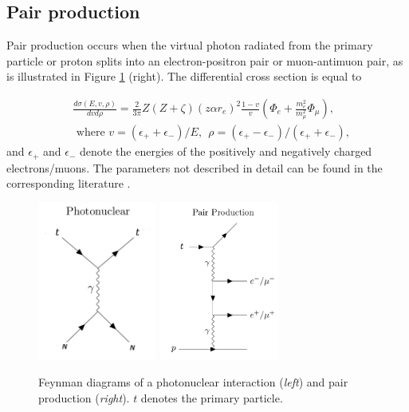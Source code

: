 \subsection{Pair production}
\label{subsec:pairprod}
Pair production occurs when the virtual photon radiated from the primary particle or proton splits into an electron-positron pair or muon-antimuon pair, as is illustrated in Figure \ref{fig:feynmannuclpairprod} (right). The differential cross section is equal to
 
\begin{equation}
\begin{split}
&\frac{d\sigma(E,v,\rho)}{dvd\rho} = \frac{2}{3\pi} Z(Z+\zeta)(z \alpha r_e)^2 \frac{1-v}{v} \left(\Phi_e + \frac{m_e^2}{m_\mu^2} \Phi_\mu \right), \\
& \textrm{ where \ \ } v = (\epsilon_+ + \epsilon_-)/E, \ \ \rho = (\epsilon_+ - \epsilon_-)/(\epsilon_+ + \epsilon_-),
\end{split}
\end{equation}
and $\epsilon_+$ and $\epsilon_-$ denote the energies of the positively and negatively charged electrons/muons. The parameters not described in detail can be found in the corresponding literature \cite{Chirkin:2004hz}.

\begin{figure}
\centering
\includegraphics[width = 0.35\textwidth]{chapter4/img/Feynman_PhotoNuclear_2.png}
\includegraphics[width = 0.35\textwidth]{chapter4/img/Feynman_PairProduction_2.png}
\caption{Feynman diagrams of a photonuclear interaction (\textit{left}) and pair production (\textit{right}). $t$ denotes the primary particle.}
\label{fig:feynmannuclpairprod}
\end{figure}

